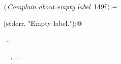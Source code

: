 \documentclass[a4paper]{report}
\begin{document}
\begin{flushleft} \small
\begin{minipage}{\linewidth}\label{scrap332}\raggedright\small
{} $\langle\,${\it Complain about empty label}\nobreak\ {\footnotesize {149f}}$\,\rangle\equiv$
\vspace{-1ex}
\begin{list}{}{} \item
\mbox{}\verb@fprintf(stderr, "Empty label.\n");@{\NWsep}
\end{list}
\vspace{-1.5ex}
\footnotesize
\begin{list}{}{\setlength{\itemsep}{-\parsep}\setlength{\itemindent}{-\leftmargin}}
\item \NWtxtMacroRefIn\ .
\item \NWtxtIdentsUsed\nobreak\  \verb@fprintf@\nobreak\ , \verb@stderr@\nobreak\ .
\item{}
\end{list}
\end{minipage}\vspace{4ex}
\end{flushleft}
\end{document}
